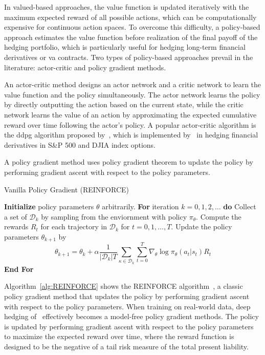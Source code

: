 In valued-based approaches, the value function is updated iteratively with the maximum expected reward of all possible actions, which can be computationally expensive for continuous action spaces.
To overcome this difficulty, a policy-based approach estimates the value function before realization of the final payoff of the hedging portfolio, which is particularly useful for hedging long-term financial derivatives or \gls{va} contracts.
Two types of policy-based approaches prevail in the literature: actor-critic and policy gradient methods.

An actor-critic method designs an actor network and a critic network to learn the value function and the policy simultaneously.
The actor network learns the policy by directly outputting the action based on the current state, while the critic network learns the value of an action by approximating the expected cumulative reward over time following the actor's policy.
A popular actor-critic algorithm is the \gls{ddpg} algorithm proposed by~\cite{lillicrap2015continuous}, which is implemented by~\cite{xu2022delta} in hedging financial derivatives in S\&P 500 and DJIA index options.

A policy gradient method uses policy gradient theorem to update the policy by performing gradient ascent with respect to the policy parameters.

\begin{algorithm}[H] 
    \caption{Vanilla Policy Gradient (REINFORCE)}
    \begin{algorithmic}[1] \label{alg:REINFORCE}
    \STATE \textbf{Initialize} policy parameters $\theta$ arbitrarily.
    \STATE  \textbf{For} {iteration $k=0, 1,2,\ldots$} \textbf{do}
        \STATE \quad  Collect a set of $\mathcal{D}_k$ by sampling from the enviornment with policy $\pi_\theta$.
        \STATE  \quad Compute the rewards $R_t$ for each trajectory in $\mathcal{D}_k$ for $t=0,1,\ldots,T$.
        \STATE  \quad Update the policy parameters $\theta_{k+1}$ by 
        \begin{equation*}
            \theta_{k+1} = \theta_k + \alpha \frac{1}{|\mathcal{D}_k|T} \sum_{\mathcal{\kappa} \in \mathcal{D}_k} \sum_{t=0}^{T} \nabla_\theta \log \pi_\theta(a_t | s_t) R_t
        \end{equation*}
    \STATE  \textbf{End For}
    \end{algorithmic}
\end{algorithm}

Algorithm~\ref{alg:REINFORCE} shows the REINFORCE algorithm~\citep{sutton1999policy}, a classic policy gradient method that updates the policy by performing gradient ascent with respect to the policy parameters.
When training on real-world data, deep hedging of~\cite{buehler2019deep} effectively becomes a model-free policy gradient methods. 
The policy is updated by performing gradient ascent with respect to the policy parameters to maximize the expected reward over time, where the reward function is designed to be the negative of a tail risk measure of the total present liability.

